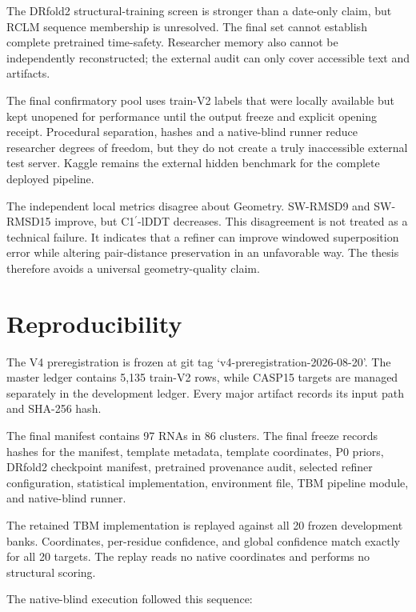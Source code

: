 \documentclass[12pt,a4paper,oneside]{report}
\newcommand{\cprime}{C1$^{\prime}$}
\begin{document}
The DRfold2 structural-training screen is stronger than a date-only claim, but RCLM
sequence membership is unresolved. The final set cannot establish complete pretrained
time-safety. Researcher memory also cannot be independently reconstructed; the
external audit can only cover accessible text and artifacts.

The final confirmatory pool uses train-V2 labels that were locally available but kept
unopened for performance until the output freeze and explicit opening receipt.
Procedural separation, hashes and a native-blind runner reduce researcher degrees of
freedom, but they do not create a truly inaccessible external test server. Kaggle
remains the external hidden benchmark for the complete deployed pipeline.

The independent local metrics disagree about Geometry. SW-RMSD9 and SW-RMSD15 improve,
but \cprime{}-lDDT decreases. This disagreement is not treated as a technical failure.
It indicates that a refiner can improve windowed superposition error while altering
pair-distance preservation in an unfavorable way. The thesis therefore avoids a
universal geometry-quality claim.

\chapter{Reproducibility}

The V4 preregistration is frozen at git tag `v4-preregistration-2026-08-20'. The master
ledger contains 5,135 train-V2 rows, while CASP15 targets are managed separately in the
development ledger. Every major artifact records its input path and SHA-256 hash.

The final manifest contains 97 RNAs in 86 clusters. The final freeze records hashes for
the manifest, template metadata, template coordinates, P0 priors, DRfold2 checkpoint
manifest, pretrained provenance audit, selected refiner configuration, statistical
implementation, environment file, TBM pipeline module, and native-blind runner.

The retained TBM implementation is replayed against all 20 frozen development banks.
Coordinates, per-residue confidence, and global confidence match exactly for all 20
targets. The replay reads no native coordinates and performs no structural scoring.

The native-blind execution followed this sequence:
\end{document}
